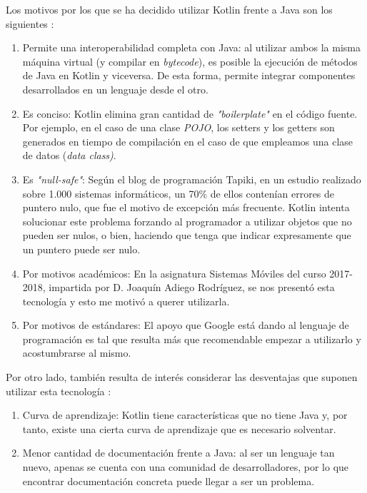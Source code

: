\documentclass[twoside]{report}
\begin{document}
Los motivos por los que se ha decidido utilizar Kotlin frente a Java son los siguientes \cite{kotlin}:
\begin{enumerate}

\item Permite una interoperabilidad completa con Java: al utilizar ambos la misma máquina virtual (y compilar en \textit{bytecode}), es posible la ejecución de métodos de Java en Kotlin y viceversa. De esta forma, permite integrar componentes desarrollados en un lenguaje desde el otro.

\item Es conciso: Kotlin elimina gran cantidad de \textit{"boilerplate"} en el código fuente. Por ejemplo, en el caso de una clase \textit{POJO}, los setters y los getters son generados en tiempo de compilación en el caso de que empleamos una clase de datos (\textit{data class)}.

\item Es \textit{"null-safe"}: Según el blog de programación \cite{tapikinull} Tapiki, en un estudio realizado sobre 1.000 sistemas informáticos, un 70\% de ellos contenían errores de puntero nulo, que fue el motivo de excepción más frecuente. Kotlin intenta solucionar este problema forzando al programador a utilizar objetos que no pueden ser nulos, o bien, haciendo que tenga que indicar expresamente que un puntero puede ser nulo.

\item Por motivos académicos: En la asignatura \cite{smovkotlin} Sistemas Móviles del curso 2017-2018, impartida por D. Joaquín Adiego Rodríguez, se nos presentó esta tecnología y esto me motivó a querer utilizarla.

\item Por motivos de estándares: El apoyo que Google está dando al lenguaje de programación es tal que resulta más que recomendable empezar a utilizarlo y acostumbrarse al mismo.
\end{enumerate}

Por otro lado, también resulta de interés considerar las desventajas que suponen utilizar esta tecnología \cite{disadvKotlin}:
\begin{enumerate}

\item Curva de aprendizaje: Kotlin tiene características que no tiene Java y, por tanto, existe una cierta curva de aprendizaje que es necesario solventar.

\item Menor cantidad de documentación frente a Java: al ser un lenguaje tan nuevo, apenas se cuenta con una comunidad de desarrolladores, por lo que encontrar documentación concreta puede llegar a ser un problema.
\end{enumerate}
\end{document}
